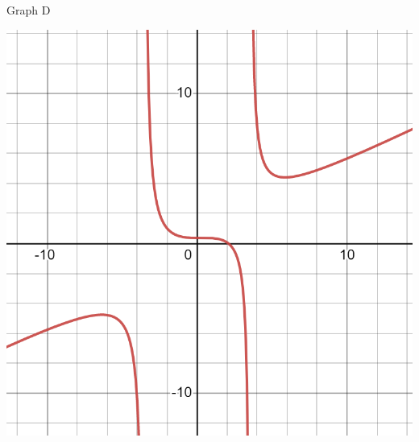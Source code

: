 \documentclass{ximera}
\begin{document}
\begin{exercise}
\begin{center}
\large Graph D\\
\begin{image}
\includegraphics[width=0.49\linewidth]{RF17-4.png}
\end{image}
\end{center}

\end{exercise}
\end{document}
